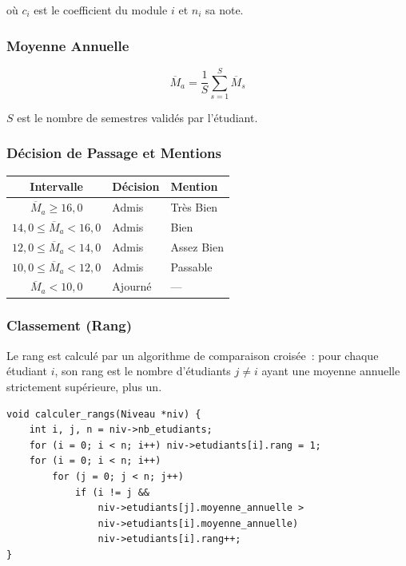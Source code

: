 \documentclass[a4paper,12pt]{article}
\begin{document}
où $c_i$ est le coefficient du module $i$ et $n_i$ sa note.

\subsubsection{Moyenne Annuelle}

\begin{equation}
  \overline{M}_a = \frac{1}{S} \sum_{s=1}^{S} \overline{M}_s
  \label{eq:moy-an}
\end{equation}

$S$ est le nombre de semestres validés par l'étudiant.

\subsubsection{Décision de Passage et Mentions}

\begin{center}
\renewcommand{\arraystretch}{1.4}
\begin{tabular}{cll}
\toprule
\textbf{Intervalle} & \textbf{Décision} & \textbf{Mention} \\
\midrule
$\overline{M}_a \ge 16{,}0$ & Admis & Très Bien \\
$14{,}0 \le \overline{M}_a < 16{,}0$ & Admis & Bien \\
$12{,}0 \le \overline{M}_a < 14{,}0$ & Admis & Assez Bien \\
$10{,}0 \le \overline{M}_a < 12{,}0$ & Admis & Passable \\
$\overline{M}_a < 10{,}0$ & Ajourné & — \\
\bottomrule
\end{tabular}
\end{center}

\subsubsection{Classement (Rang)}

Le rang est calculé par un algorithme de comparaison croisée~: pour chaque étudiant $i$, son rang est le nombre d'étudiants $j \ne i$ ayant une moyenne annuelle strictement supérieure, plus un.

\begin{lstlisting}[caption={Algorithme de calcul des rangs}, style=c, label=lst:rangs]
void calculer_rangs(Niveau *niv) {
    int i, j, n = niv->nb_etudiants;
    for (i = 0; i < n; i++) niv->etudiants[i].rang = 1;
    for (i = 0; i < n; i++)
        for (j = 0; j < n; j++)
            if (i != j &&
                niv->etudiants[j].moyenne_annuelle >
                niv->etudiants[i].moyenne_annuelle)
                niv->etudiants[i].rang++;
}
\end{lstlisting}
\end{document}
